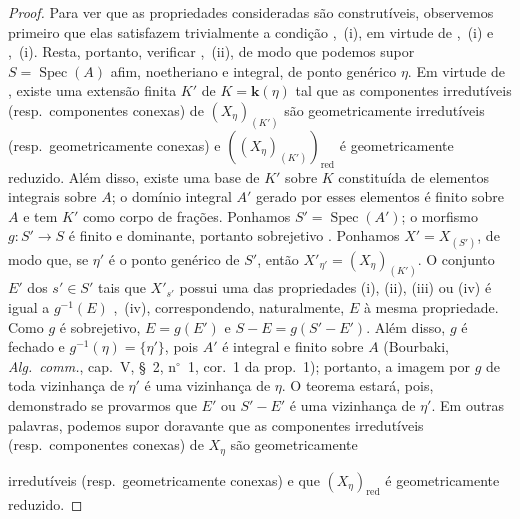\begin{proof}
Para ver que as propriedades consideradas são construtíveis, observemos primeiro que elas satisfazem trivialmente a condição ,~(i), em virtude de ,~(i) e ,~(i).
Resta, portanto, verificar ,~(ii), de modo que podemos supor $S=\operatorname{Spec}(A)$ afim, noetheriano e integral, de ponto genérico $\eta$.
Em virtude de , existe uma extensão finita $K'$ de $K=\boldsymbol{k}(\eta)$ tal que as componentes irredutíveis (resp.\ componentes conexas) de $(X_\eta)_{(K')}$ são geometricamente irredutíveis (resp.\ geometricamente conexas) e $((X_\eta)_{(K')})_\mathrm{red}$ é geometricamente reduzido.
Além disso, existe uma base de $K'$ sobre $K$ constituída de elementos integrais sobre $A$; o domínio integral $A'$ gerado por esses elementos é finito sobre $A$ e tem $K'$ como corpo de frações.
Ponhamos $S'=\operatorname{Spec}(A')$; o morfismo $g:S'\to S$ é finito e dominante, portanto sobrejetivo . Ponhamos $X'=X_{(S')}$, de modo que, se $\eta'$ é o ponto genérico de $S'$, então $X'_{\eta'}=(X_\eta)_{(K')}$. O conjunto $E'$ dos $s'\in S'$ tais que $X'_{s'}$ possui uma das propriedades (i), (ii), (iii) ou (iv) é igual a $g^{-1}(E)$ ,~(iv), correspondendo, naturalmente, $E$ à mesma propriedade. Como $g$ é sobrejetivo, $E=g(E')$ e $S-E=g(S'-E')$. Além disso, $g$ é fechado e $g^{-1}(\eta)=\{\eta'\}$, pois $A'$ é integral e finito sobre $A$ (Bourbaki, \emph{Alg.\ comm.}, cap.\ V, \S~2, n$^\circ$~1, cor.\ 1 da prop.\ 1); portanto, a imagem por $g$ de toda vizinhança de $\eta'$ é uma vizinhança de $\eta$.
O teorema estará, pois, demonstrado se provarmos que $E'$ ou $S'-E'$ é uma vizinhança de $\eta'$.
Em outras palavras, podemos supor doravante que as componentes irredutíveis (resp.\ componentes conexas) de $X_\eta$ são geometricamente


irredutíveis (resp.\ geometricamente conexas) e que $(X_\eta)_\mathrm{red}$ é geometricamente reduzido.


\end{proof}
